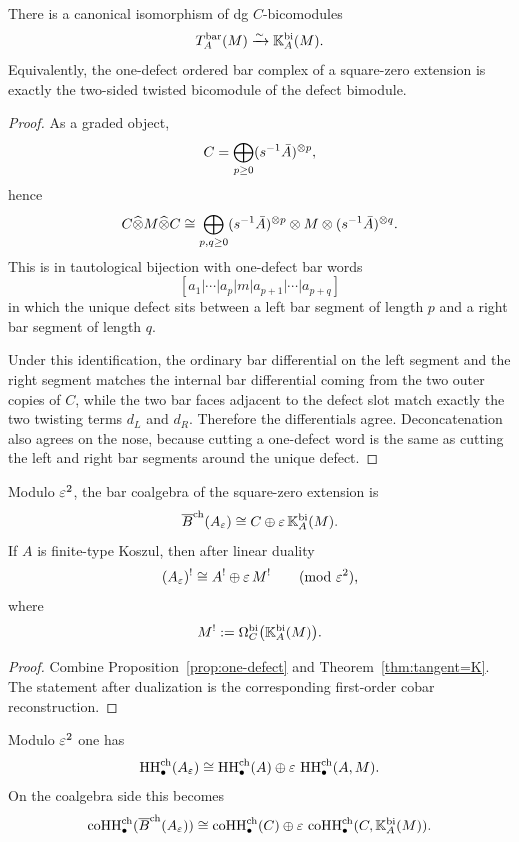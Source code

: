 \begin{theorem}
\label{thm:tangent=K}
There is a canonical isomorphism of dg $C$-bicomodules
\[
T_A^{\mathrm{bar}}(M)\xrightarrow{\sim}\mathbb{K}_A^{\mathrm{bi}}(M).
\]
Equivalently, the one-defect ordered bar complex of a square-zero extension is exactly the two-sided
twisted bicomodule of the defect bimodule.
\end{theorem}

\begin{proof}
As a graded object,
\[
C=\bigoplus_{p\geq 0} (s^{-1}\bar A)^{\otimes p},
\]
hence
\[
C\widehat\otimes M\widehat\otimes C
\cong
\bigoplus_{p,q\geq 0}
(s^{-1}\bar A)^{\otimes p}\otimes M\otimes(s^{-1}\bar A)^{\otimes q}.
\]
This is in tautological bijection with one-defect bar words
\[
[a_1|\cdots|a_p|m|a_{p+1}|\cdots|a_{p+q}]
\]
in which the unique defect sits between a left bar segment of length $p$ and a right bar segment of
length $q$.

Under this identification, the ordinary bar differential on the left segment and the right segment
matches the internal bar differential coming from the two outer copies of $C$, while the two bar
faces adjacent to the defect slot match exactly the two twisting terms $d_L$ and $d_R$.
Therefore the differentials agree. Deconcatenation also agrees on the nose, because cutting a
one-defect word is the same as cutting the left and right bar segments around the unique defect.
\end{proof}

\begin{corollary}
\label{cor:infdual}
Modulo $\varepsilon^2$, the bar coalgebra of the square-zero extension is
\[
\overline{B}^{\mathrm{ch}}(A_\varepsilon)\cong C\oplus \varepsilon\,\mathbb{K}_A^{\mathrm{bi}}(M).
\]
If $A$ is finite-type Koszul, then after linear duality
\[
(A_\varepsilon)^!\cong A^!\oplus \varepsilon\, M^!
\qquad (\mathrm{mod}\ \varepsilon^2),
\]
where
\[
M^!:=\Omega_C^{\mathrm{bi}}\bigl(\mathbb{K}_A^{\mathrm{bi}}(M)\bigr).
\]
\end{corollary}

\begin{proof}
Combine Proposition~\ref{prop:one-defect} and Theorem~\ref{thm:tangent=K}. The statement after
dualization is the corresponding first-order cobar reconstruction.
\end{proof}

\begin{proposition}
\label{prop:infann}
Modulo $\varepsilon^2$ one has
\[
\operatorname{HH}^{\mathrm{ch}}_\bullet(A_\varepsilon)
\cong
\operatorname{HH}^{\mathrm{ch}}_\bullet(A)\oplus \varepsilon\, \operatorname{HH}^{\mathrm{ch}}_\bullet(A,M).
\]
On the coalgebra side this becomes
\[
\operatorname{coHH}^{\mathrm{ch}}_\bullet(\overline{B}^{\mathrm{ch}}(A_\varepsilon))
\cong
\operatorname{coHH}^{\mathrm{ch}}_\bullet(C)\oplus \varepsilon\,
\operatorname{coHH}^{\mathrm{ch}}_\bullet(C,\mathbb{K}_A^{\mathrm{bi}}(M)).
\]
\end{proposition}

